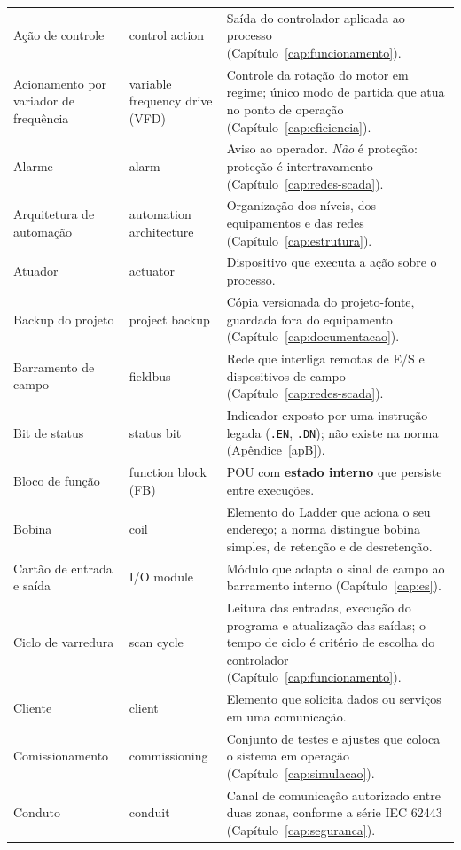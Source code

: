 \begin{longtable}{p{3.3cm} p{3.3cm} p{8.4cm}}
  Ação de controle & control action & Saída do controlador aplicada ao processo
    (Capítulo~\ref{cap:funcionamento}). \\
  Acionamento por variador de frequência & variable frequency drive (VFD) & Controle da rotação do
    motor em regime; único modo de partida que atua no ponto de operação
    (Capítulo~\ref{cap:eficiencia}). \\
  Alarme & alarm & Aviso ao operador. \emph{Não} é proteção: proteção é intertravamento
    (Capítulo~\ref{cap:redes-scada}). \\
  Arquitetura de automação & automation architecture & Organização dos níveis, dos equipamentos e das
    redes (Capítulo~\ref{cap:estrutura}). \\
  Atuador & actuator & Dispositivo que executa a ação sobre o processo. \\
  Backup do projeto & project backup & Cópia versionada do projeto-fonte, guardada fora do
    equipamento (Capítulo~\ref{cap:documentacao}). \\
  Barramento de campo & fieldbus & Rede que interliga remotas de E/S e dispositivos de campo
    (Capítulo~\ref{cap:redes-scada}). \\
  Bit de status & status bit & Indicador exposto por uma instrução legada (\texttt{.EN}, \texttt{.DN});
    não existe na norma (Apêndice~\ref{apB}). \\
  Bloco de função & function block (FB) & POU com \textbf{estado interno} que persiste entre
    execuções. \\
  Bobina & coil & Elemento do Ladder que aciona o seu endereço; a norma distingue bobina simples,
    de retenção e de desretenção. \\
  Cartão de entrada e saída & I/O module & Módulo que adapta o sinal de campo ao barramento interno
    (Capítulo~\ref{cap:es}). \\
  Ciclo de varredura & scan cycle & Leitura das entradas, execução do programa e atualização das
    saídas; o tempo de ciclo é critério de escolha do controlador
    (Capítulo~\ref{cap:funcionamento}). \\
  Cliente & client & Elemento que solicita dados ou serviços em uma comunicação. \\
  Comissionamento & commissioning & Conjunto de testes e ajustes que coloca o sistema em operação
    (Capítulo~\ref{cap:simulacao}). \\
  Conduto & conduit & Canal de comunicação autorizado entre duas zonas, conforme a série IEC 62443
    (Capítulo~\ref{cap:seguranca}). \\

\end{longtable}
